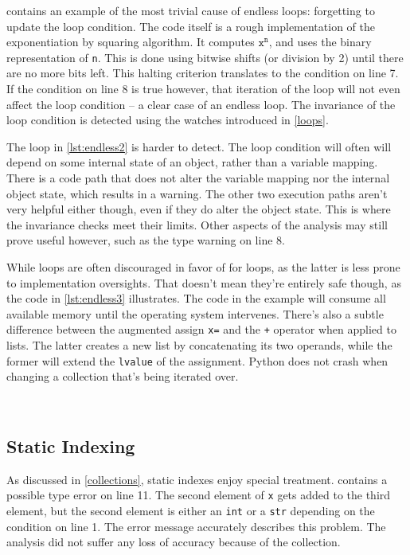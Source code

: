 \documentclass[a4paper, 16pt, oneside]{Thesis}
\begin{document}
 contains an example of the most trivial cause of
endless loops: forgetting to update the loop condition. The code itself
is a rough implementation of the exponentiation by squaring algorithm.
It computes \(\texttt{x}^\texttt{n}\), and uses the binary
representation of \texttt{n}. This is done using bitwise shifts (or
division by 2) until there are no more bits left. This halting criterion
translates to the condition on line 7. If the condition on line 8 is
true however, that iteration of the loop will not even affect the loop
condition -- a clear case of an endless loop. The invariance of the loop
condition is detected using the watches introduced in \cref{loops}.



The loop in \cref{lst:endless2} is harder to detect. The loop condition
will often will depend on some internal state of an object, rather than
a variable mapping. There is a code path that does not alter the
variable mapping nor the internal object state, which results in a
warning. The other two execution paths aren't very helpful either
though, even if they do alter the object state. This is where the
invariance checks meet their limits. Other aspects of the analysis may
still prove useful however, such as the type warning on line 8.



While loops are often discouraged in favor of for loops, as the latter
is less prone to implementation oversights. That doesn't mean they're
entirely safe though, as the code in \cref{lst:endless3} illustrates.
The code in the example will consume all available memory until the
operating system intervenes. There's also a subtle difference between
the augmented assign \texttt{x=} and the \texttt{+} operator when
applied to lists. The latter creates a new list by concatenating its two
operands, while the former will extend the \texttt{lvalue} of the
assignment. Python does not crash when changing a collection that's
being iterated over.

~

\subsection{Static Indexing}\label{static-indexing}

As discussed in \cref{collections}, static indexes enjoy special
treatment.  contains a possible type error on line
11. The second element of \texttt{x} gets added to the third element,
but the second element is either an \texttt{int} or a \texttt{str}
depending on the condition on line 1. The error message accurately
describes this problem. The analysis did not suffer any loss of accuracy
because of the collection.
\end{document}
